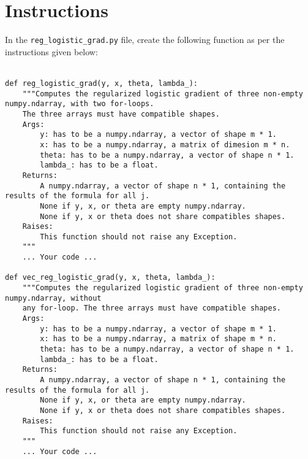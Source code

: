 \section*{Instructions}
In the \texttt{reg\_logistic\_grad.py} file, create the following function as per the 
instructions given below:\\
\\
\begin{verbatim}
def reg_logistic_grad(y, x, theta, lambda_):
	"""Computes the regularized logistic gradient of three non-empty numpy.ndarray, with two for-loops.
	The three arrays must have compatible shapes.
	Args:
		y: has to be a numpy.ndarray, a vector of shape m * 1.
		x: has to be a numpy.ndarray, a matrix of dimesion m * n.
		theta: has to be a numpy.ndarray, a vector of shape n * 1.
		lambda_: has to be a float.
	Returns:
		A numpy.ndarray, a vector of shape n * 1, containing the results of the formula for all j.
		None if y, x, or theta are empty numpy.ndarray.
		None if y, x or theta does not share compatibles shapes.
	Raises:
		This function should not raise any Exception.
	"""
	... Your code ...

def vec_reg_logistic_grad(y, x, theta, lambda_):
	"""Computes the regularized logistic gradient of three non-empty numpy.ndarray, without 
	any for-loop. The three arrays must have compatible shapes.
	Args:
		y: has to be a numpy.ndarray, a vector of shape m * 1.
		x: has to be a numpy.ndarray, a matrix of shape m * n.
		theta: has to be a numpy.ndarray, a vector of shape n * 1.
		lambda_: has to be a float.
	Returns:
		A numpy.ndarray, a vector of shape n * 1, containing the results of the formula for all j.
		None if y, x, or theta are empty numpy.ndarray.
		None if y, x or theta does not share compatibles shapes.
	Raises:
		This function should not raise any Exception.
	"""
	... Your code ...
\end{verbatim}


